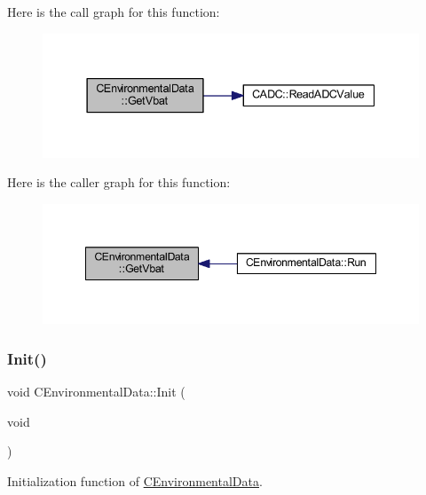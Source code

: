 Here is the call graph for this function\+:
\nopagebreak
\begin{figure}[H]
\begin{center}
\leavevmode
\includegraphics[width=337pt]{class_c_environmental_data_a12a6d60a2a0aa406beb82375fa60e875_cgraph}
\end{center}
\end{figure}
Here is the caller graph for this function\+:
\nopagebreak
\begin{figure}[H]
\begin{center}
\leavevmode
\includegraphics[width=348pt]{class_c_environmental_data_a12a6d60a2a0aa406beb82375fa60e875_icgraph}
\end{center}
\end{figure}
\mbox{\label{class_c_environmental_data_a3321cce122ef1e1f7e995ee51353e87d}} 
\subsubsection{\texorpdfstring{Init()}{Init()}}
{\footnotesize\ttfamily void C\+Environmental\+Data\+::\+Init (\begin{DoxyParamCaption}\item[{void}]{ }\end{DoxyParamCaption})\hspace{0.3cm}{\ttfamily [virtual]}}



Initialization function of \mbox{\hyperlink{class_c_environmental_data}{C\+Environmental\+Data}}. 



